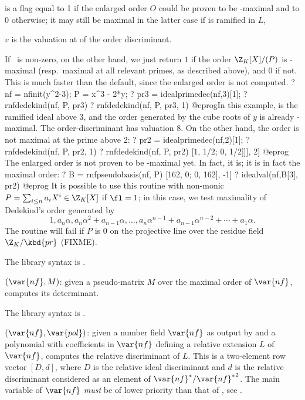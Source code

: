 \item {} is a flag equal to 1 if the enlarged order $O$
could be proven to be -maximal and to 0 otherwise; it may still be
maximal in the latter case if  is ramified in $L$,

\item $v$ is the valuation at  of the order discriminant.

If \fl\ is non-zero, on the other hand, we just return $1$ if the order
$\Z_K[X]/(P)$ is -maximal (resp.~maximal at all relevant primes, as
described above), and $0$ if not. This is much faster than the default,
since the enlarged order is not computed.
\bprog
? nf = nfinit(y^2-3); P = x^3 - 2*y;
? pr3 = idealprimedec(nf,3)[1];
? rnfdedekind(nf, P, pr3)
? rnfdedekind(nf, P, pr3, 1)
@eprog\noindent In this example,  is the ramified ideal above $3$,
and the order generated by the cube roots of $y$ is already
-maximal. The order-discriminant has valuation $8$. On the other
hand, the order is not maximal at the prime above 2:
\bprog
? pr2 = idealprimedec(nf,2)[1];
? rnfdedekind(nf, P, pr2, 1)
? rnfdedekind(nf, P, pr2)
     [1, 1/2; 0, 1/2]]], 2]
@eprog
The enlarged order is not proven to be -maximal yet. In fact, it
is; it is in fact the maximal order:
\bprog
? B = rnfpseudobasis(nf, P)
     [162, 0; 0, 162], -1]
? idealval(nf,B[3], pr2)
@eprog\noindent
It is possible to use this routine with non-monic
$P = \sum_{i\leq n} a_i X^i \in \Z_K[X]$ if $\fl = 1$;
in this case, we test maximality of Dedekind's order generated by
$$1, a_n \alpha, a_n\alpha^2 + a_{n-1}\alpha, \dots,
a_n\alpha^{n-1} + a_{n-1}\alpha^{n-2} + \cdots + a_1\alpha.$$
The routine will fail if $P$ is $0$ on the projective line over the residue
field $\Z_K/\kbd{pr}$ (FIXME).

The library syntax is .

$(\var{nf},M)$: \label{se:rnfdet}given a pseudo-matrix $M$ over the maximal
order of $\var{nf}$, computes its determinant.

The library syntax is .

$(\var{nf},\var{pol})$: \label{se:rnfdisc}given a number field $\var{nf}$ as
output by  and a polynomial  with coefficients in
$\var{nf}$ defining a relative extension $L$ of $\var{nf}$, computes the
relative discriminant of $L$. This is a two-element row vector $[D,d]$, where
$D$ is the relative ideal discriminant and $d$ is the relative discriminant
considered as an element of $\var{nf}^*/{\var{nf}^*}^2$. The main variable of
$\var{nf}$ \emph{must} be of lower priority than that of , see
.

